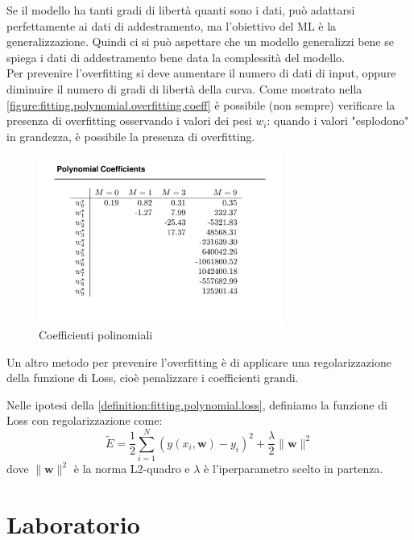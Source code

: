 \documentclass[
	a4paper,
	11pt,
	oneside
]{book}
\theoremstyle{std}
\begin{document}
	Se il modello ha tanti gradi di libertà quanti sono i dati, può adattarsi perfettamente ai dati di addestramento, ma l'obiettivo del ML è la generalizzazione. Quindi ci si può aspettare che un modello generalizzi bene se spiega i dati di addestramento bene data la complessità del modello.\\
	Per prevenire l'overfitting si deve aumentare il numero di dati di input, oppure diminuire il numero di gradi di libertà della curva.
	Come mostrato nella \autoref{figure:fitting.polynomial.overfitting.coeff} è possibile (non sempre) verificare la presenza di overfitting osservando i valori dei pesi $ w_i $: quando i valori "esplodono" in grandezza, è possibile la presenza di overfitting.
	\begin{figure}[h]
		\centering
		\includegraphics[width = 8cm]{overfitting_coeff.png}
		\caption{Coefficienti polinomiali}
		\label{figure:fitting.polynomial.overfitting.coeff}
	\end{figure}
	Un altro metodo per prevenire l'overfitting è di applicare una regolarizzazione della funzione di Loss, cioè penalizzare i coefficienti grandi.
	\begin{definition}
		Nelle ipotesi della \autoref{definition:fitting.polynomial.loss}, definiamo la funzione di Loss con regolarizzazione come:
		$$
			\tilde{E} = \frac{1}{2} \sum_{i=1}^N \left(y(x_i, \textbf{w}) -y_i\right)^2 + \frac{\lambda}{2} \lVert \textbf{w} \rVert^2
		$$
		dove $ \lVert \textbf{w} \rVert^2 $ è la norma L2-quadro e $ \lambda $ è l'iperparametro scelto in partenza.
	\end{definition}
	
	\part{Laboratorio}
	
\end{document}
